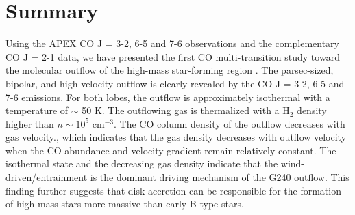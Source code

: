 \section{Summary}\label{summary}

Using the APEX CO J = 3-2, 6-5 and 7-6 observations and the complementary CO J = 2-1 data, we have presented the first CO multi-transition study toward the molecular outflow of the high-mass star-forming region . The parsec-sized, bipolar, and high velocity outflow is clearly revealed by the CO J = 3-2, 6-5 and 7-6 emissions. For both lobes, the outflow is approximately isothermal with a temperature of $\sim$ 50 K. The outflowing gas is thermalized with a H$_2$ density higher than $n \sim 10^5$ cm$^{-3}$. The CO column density of the outflow decreases with gas velocity., which indicates that the gas density decreases with outflow velocity when the CO abundance and velocity gradient remain relatively constant. The isothermal state and the decreasing gas density indicate that the wind-driven/entrainment is the dominant driving mechanism of the G240 outflow. This finding further suggests that disk-accretion can be responsible for the formation of high-mass stars more massive than early B-type stars.

